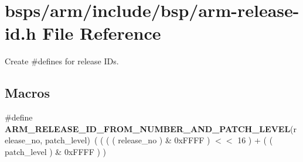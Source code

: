 \hypertarget{arm-release-id_8h}{}\section{bsps/arm/include/bsp/arm-\/release-\/id.h File Reference}
\label{arm-release-id_8h}


Create \#defines for release I\+Ds.  


\subsection*{Macros}
\begin{DoxyCompactItemize}
\item 
\mbox{\label{arm-release-id_8h_aa5bb3c9cbe5519ed014ea4e0b7e47d9e}} 
\#define {\bfseries A\+R\+M\+\_\+\+R\+E\+L\+E\+A\+S\+E\+\_\+\+I\+D\+\_\+\+F\+R\+O\+M\+\_\+\+N\+U\+M\+B\+E\+R\+\_\+\+A\+N\+D\+\_\+\+P\+A\+T\+C\+H\+\_\+\+L\+E\+V\+EL}(release\+\_\+no,  patch\+\_\+level)~( ( ( ( release\+\_\+no ) \& 0x\+F\+F\+F\+F ) $<$$<$ 16 ) + ( ( patch\+\_\+level ) \& 0x\+F\+F\+F\+F ) )
\end{DoxyCompactItemize}

